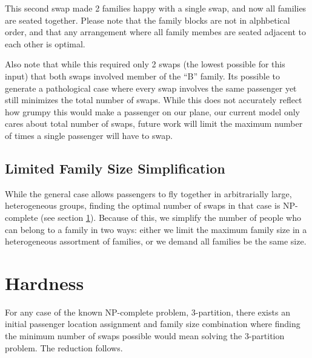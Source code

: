 \begin{figure}[H]
\centering
{}
\end{figure}

This second swap made 2 families happy with a single swap, and now all families are seated together. Please note that the family blocks are not in alphbetical order, and that any arrangement where all family membes are seated adjacent to each other is optimal.  

Also note that while this required only 2 swaps (the lowest possible for this input) that both swaps involved member of the ``B'' family.  Its possible to generate a pathological case where every swap involves the same passenger yet still minimizes the total number of swaps.  While this does not accurately reflect how grumpy this would make a passenger on our plane, our current model only cares about total number of swaps, future work will limit the maximum number of times a single passenger will have to swap.

\subsection{Limited Family Size Simplification}

While the general case allows passengers to fly together in arbitrarially large, heterogeneous groups, finding the optimal number of swaps in that case is NP-complete (see section \ref{sec:hardness}).  Because of this, we simplify the number of people who can belong to a family in two ways: either we limit the maximum family size in a heterogeneous assortment of families, or we demand all families be the same size.  

\section{Hardness} \label{sec:hardness}

For any case of the known NP-complete problem, 3-partition, there exists an initial passenger location assignment and family size combination where finding the minimum number of swaps possible would mean solving the 3-partition problem.  The reduction follows.

